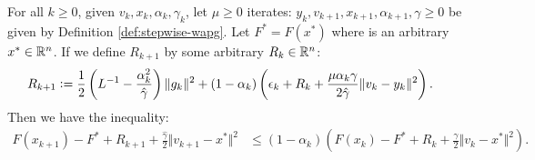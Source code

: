 \documentclass[12pt]{article}
\begin{document}
    \begin{proposition}\label{prop:stepwise-lyapunov}
        For all $k \ge 0$, given $v_k, x_k, \alpha_k, \gamma_k$, let $\mu \ge 0$ iterates: $y_k, v_{k + 1}, x_{k + 1}, \alpha_{k + 1},\gamma \ge 0$ be given by Definition \ref{def:stepwise-wapg}. 
        Let $F^* = F(x^*)$ where is an arbitrary $x^* \in \mathbb R^n$. 
        If we define $R_{k + 1}$ by some arbitrary $R_k \in \mathbb R^n$: 
        \begin{align*}
            R_{k + 1}
            &\vcentcolon= 
            \frac{1}{2}\left(
                L^{-1} - \frac{\alpha_k^2}{\hat\gamma}
            \right)\Vert g_k\Vert^2
            + 
            (1 - \alpha_k)
            \left(
                \epsilon_k + R_k + 
                \frac{\mu\alpha_k\gamma}{2\hat\gamma}
                \Vert v_k - y_k\Vert^2
            \right). 
        \end{align*}
        Then we have the inequality: 
        \begin{align*}
            F(x_{k + 1}) - F^* + R_{k + 1} + \frac{\hat \gamma}{2}\Vert v_{k + 1} - x^*\Vert^2
            &\le 
            (1 - \alpha_k)
            \left(
                F(x_k) - F^* + R_k + \frac{\gamma}{2}\Vert v_k - x^*\Vert^2
            \right). 
        \end{align*}
    \end{proposition}
\end{document}
